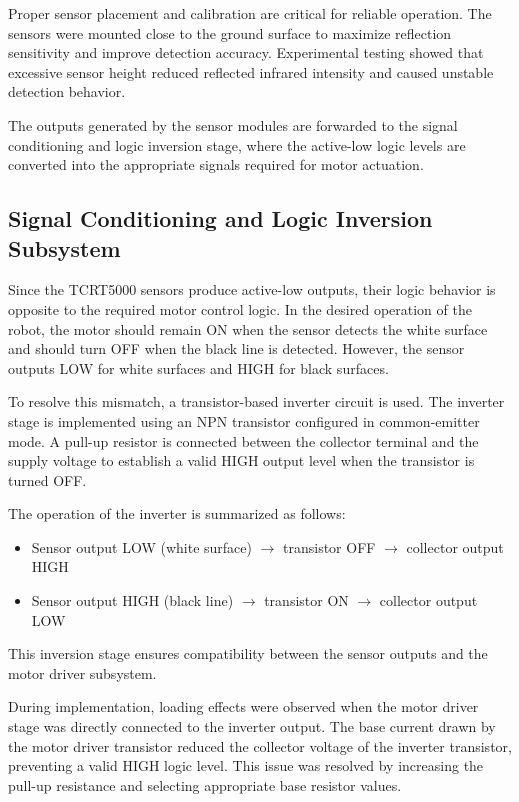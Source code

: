 \documentclass[conference]{IEEEtran}
\begin{document}
Proper sensor placement and calibration are critical for reliable operation. The sensors were mounted close to the ground surface to maximize reflection sensitivity and improve detection accuracy. Experimental testing showed that excessive sensor height reduced reflected infrared intensity and caused unstable detection behavior.

The outputs generated by the sensor modules are forwarded to the signal conditioning and logic inversion stage, where the active-low logic levels are converted into the appropriate signals required for motor actuation.

\subsection{Signal Conditioning and Logic Inversion Subsystem}

Since the TCRT5000 sensors produce active-low outputs, their logic behavior is opposite to the required motor control logic. In the desired operation of the robot, the motor should remain ON when the sensor detects the white surface and should turn OFF when the black line is detected. However, the sensor outputs LOW for white surfaces and HIGH for black surfaces.

To resolve this mismatch, a transistor-based inverter circuit is used. The inverter stage is implemented using an NPN transistor configured in common-emitter mode. A pull-up resistor is connected between the collector terminal and the supply voltage to establish a valid HIGH output level when the transistor is turned OFF.

The operation of the inverter is summarized as follows:

\begin{itemize}
    \item Sensor output LOW (white surface) $\rightarrow$ transistor OFF $\rightarrow$ collector output HIGH
    \item Sensor output HIGH (black line) $\rightarrow$ transistor ON $\rightarrow$ collector output LOW
\end{itemize}

This inversion stage ensures compatibility between the sensor outputs and the motor driver subsystem.

During implementation, loading effects were observed when the motor driver stage was directly connected to the inverter output. The base current drawn by the motor driver transistor reduced the collector voltage of the inverter transistor, preventing a valid HIGH logic level. This issue was resolved by increasing the pull-up resistance and selecting appropriate base resistor values.
\end{document}
